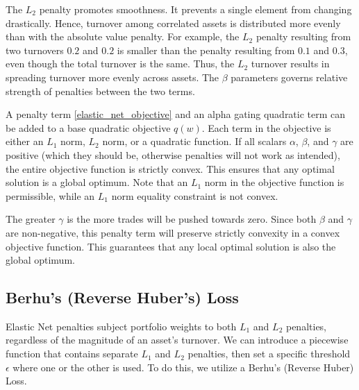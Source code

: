 \documentclass[11pt, letterpaper]{article}
\begin{document}
The ${L_2}$ penalty promotes smoothness. It prevents a single element from changing drastically. Hence, turnover among
correlated assets is distributed more evenly than with the absolute value penalty. For example, the $L_2$ penalty resulting from
two turnovers $0.2$ and $0.2$ is smaller than the penalty resulting from $0.1$ and $0.3$, even though the total turnover is the
same. Thus, the $L_2$ turnover results in spreading turnover more evenly across assets. The $\beta$ parameters governs relative
strength of penalties between the two terms.

A penalty term \eqref{elastic_net_objective} and an alpha gating quadratic term can be added to a base quadratic objective
$q(w)$.
Each term in the objective is either an $L_1$ norm, $L_2$ norm, or a quadratic function. If all scalars $\alpha$, $\beta$,
and $\gamma$ are positive (which they should be, otherwise penalties will not work as intended), the entire objective
function is strictly convex. This ensures that any optimal solution is a global optimum. Note that an $L_1$ norm in
the objective function is permissible, while an $L_1$ norm equality constraint is not convex.

The greater $\gamma$ is the more trades will be pushed towards zero. Since both $\beta$ and $\gamma$ are non-negative, this
penalty term will preserve strictly convexity in a convex objective function. This guarantees that any local optimal solution is
also the global optimum.

\subsection{Berhu's (Reverse Huber's) Loss}
Elastic Net penalties subject portfolio weights to both $L_1$ and $L_2$ penalties, regardless of the magnitude of an asset's turnover.
We can introduce a piecewise function that contains separate $L_1$ and $L_2$ penalties, then set a specific threshold $\epsilon$ where one
or the other is used. To do this, we utilize a Berhu's (Reverse Huber) Loss.
\end{document}
